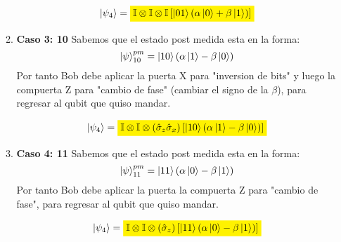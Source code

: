 \begin{itemize}
\begin{enumerate}[label=\arabic*.]
                \[
                    \ket{\psi_4} = \mathcolorbox{yellow}{\mathbb{I} \otimes \mathbb{I} \otimes \mathbb{I}
                    \left[ \ket{01} (\alpha\ket{0}+\beta\ket{1}) \right]}
                \]

                \vspace{.3cm}

            \item \textbf{Caso 3: 10}
                Sabemos que el estado post medida esta en la forma:
                \[
                    \ket{\psi}_{10}^{pm} = \ket{10} (\alpha\ket{1}-\beta\ket{0})  
                \]
                Por tanto Bob debe aplicar la puerta X para "inversion de bits" y luego la compuerta
                Z para "cambio de fase" (cambiar el signo de la $\beta$), para regresar al qubit que quiso mandar.

                \[
                    \ket{\psi_4} = \mathcolorbox{yellow}{\mathbb{I} \otimes \mathbb{I} \otimes (\hat{\sigma}_z\hat{\sigma}_x)
                    \left[ \ket{10} (\alpha\ket{1}-\beta\ket{0}) \right]}
                \]
                \vspace{.3cm}

            \item \textbf{Caso 4: 11}
                Sabemos que el estado post medida esta en la forma:
                \[
                    \ket{\psi}_{11}^{pm} = \ket{11} (\alpha\ket{0}-\beta\ket{1})  
                \]
                Por tanto Bob debe aplicar la puerta la compuerta Z para "cambio de fase", para regresar al qubit que quiso mandar.

                \[
                    \ket{\psi_4} = \mathcolorbox{yellow}{\mathbb{I} \otimes \mathbb{I} \otimes (\hat{\sigma}_z)
                    \left[ \ket{11} (\alpha\ket{0}-\beta\ket{1}) \right]}
                \]
                \vspace{.3cm}
        \end{enumerate}
\end{itemize}
